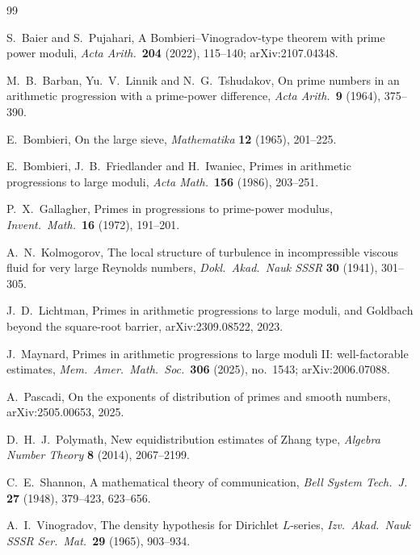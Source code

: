 \documentclass[12pt]{amsart}
\theoremstyle{plain}
\theoremstyle{definition}
\theoremstyle{remark}
\begin{document}
\begin{thebibliography}{99}

S.~Baier and S.~Pujahari,
A Bombieri--Vinogradov-type theorem with prime power moduli,
\emph{Acta Arith.}\ \textbf{204} (2022), 115--140; arXiv:2107.04348.

M.~B.~Barban, Yu.~V.~Linnik and N.~G.~Tshudakov,
On prime numbers in an arithmetic progression with a prime-power difference,
\emph{Acta Arith.}\ \textbf{9} (1964), 375--390.

E.~Bombieri,
On the large sieve,
\emph{Mathematika} \textbf{12} (1965), 201--225.

E.~Bombieri, J.~B.~Friedlander and H.~Iwaniec,
Primes in arithmetic progressions to large moduli,
\emph{Acta Math.}\ \textbf{156} (1986), 203--251.

P.~X.~Gallagher,
Primes in progressions to prime-power modulus,
\emph{Invent.\ Math.}\ \textbf{16} (1972), 191--201.

A.~N.~Kolmogorov,
The local structure of turbulence in incompressible viscous fluid for very
large Reynolds numbers,
\emph{Dokl.\ Akad.\ Nauk SSSR} \textbf{30} (1941), 301--305.

J.~D.~Lichtman,
Primes in arithmetic progressions to large moduli, and Goldbach beyond the
square-root barrier,
arXiv:2309.08522, 2023.

J.~Maynard,
Primes in arithmetic progressions to large moduli II: well-factorable
estimates,
\emph{Mem.\ Amer.\ Math.\ Soc.}\ \textbf{306} (2025), no.~1543;
arXiv:2006.07088.

A.~Pascadi,
On the exponents of distribution of primes and smooth numbers,
arXiv:2505.00653, 2025.

D.~H.~J.~Polymath,
New equidistribution estimates of Zhang type,
\emph{Algebra Number Theory} \textbf{8} (2014), 2067--2199.

C.~E.~Shannon,
A mathematical theory of communication,
\emph{Bell System Tech.\ J.} \textbf{27} (1948), 379--423, 623--656.

A.~I.~Vinogradov,
The density hypothesis for Dirichlet $L$-series,
\emph{Izv.\ Akad.\ Nauk SSSR Ser.\ Mat.}\ \textbf{29} (1965), 903--934.


\end{thebibliography}
\end{document}
